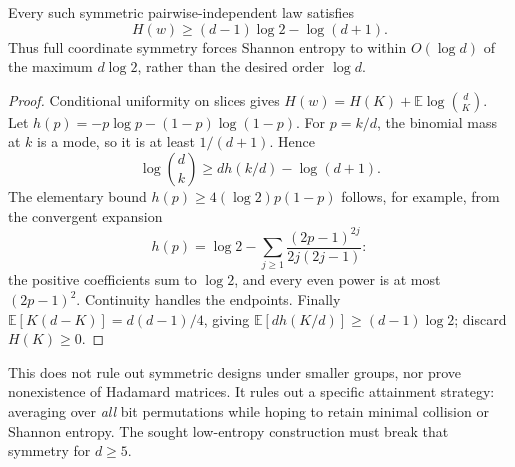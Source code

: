 \begin{theorem}
\label{thm:symmetry-shannon}
Every such symmetric pairwise-independent law satisfies
\[
 H(w)\ge(d-1)\log2-\log(d+1).
\]
Thus full coordinate symmetry forces Shannon entropy to within
$O(\log d)$ of the maximum $d\log2$, rather than the desired
order $\log d$.
\end{theorem}
\begin{proof}
Conditional uniformity on slices gives
$H(w)=H(K)+\mathbb E\log\binom dK$.
Let $h(p)=-p\log p-(1-p)\log(1-p)$. For $p=k/d$, the binomial
mass at $k$ is a mode, so it is at least $1/(d+1)$. Hence
\[
 \log\binom dk\ge d h(k/d)-\log(d+1).
\]
The elementary bound $h(p)\ge4(\log2)p(1-p)$ follows, for example,
from the convergent expansion
\[
 h(p)=\log2-\sum_{j\ge1}
           \frac{(2p-1)^{2j}}{2j(2j-1)}:
\]
the positive coefficients sum to $\log2$, and every even power is
at most $(2p-1)^2$. Continuity handles the endpoints.
Finally $\mathbb E[K(d-K)]=d(d-1)/4$, giving
$\mathbb E[d h(K/d)]\ge(d-1)\log2$; discard $H(K)\ge0$.
\end{proof}

This does not rule out symmetric designs under smaller groups, nor
prove nonexistence of Hadamard matrices. It rules out a specific
attainment strategy: averaging over \emph{all} bit permutations while
hoping to retain minimal collision or Shannon entropy. The sought
low-entropy construction must break that symmetry for $d\ge5$.
